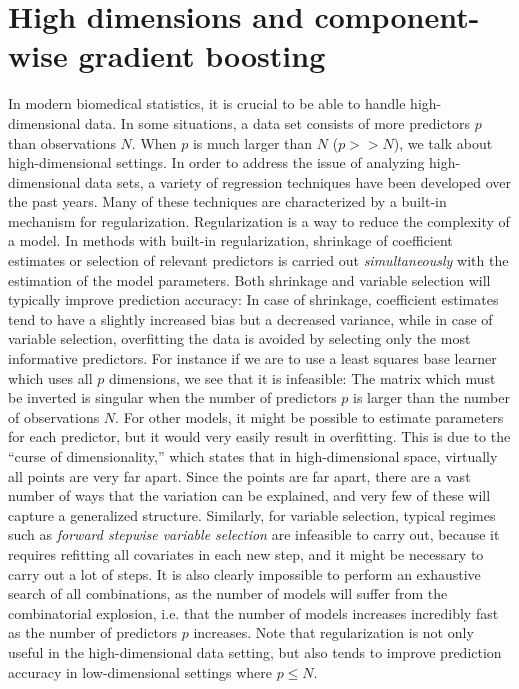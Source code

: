 \section{High dimensions and component-wise gradient boosting}\label{sec:component}
In modern biomedical statistics, it is crucial to be able to handle high-dimensional data.
In some situations, a data set consists of more predictors $p$ than observations $N$.
When $p$ is much larger than $N$ ($p>>N$), we talk about high-dimensional settings.
In order to address the issue of analyzing high-dimensional data sets, a variety of regression techniques have been developed over the past years.
Many of these techniques are characterized by a built-in mechanism for regularization.
Regularization is a way to reduce the complexity of a model.
In methods with built-in regularization, shrinkage of coefficient estimates or selection of relevant predictors is carried out \textit{simultaneously} with the estimation of the model parameters.
Both shrinkage and variable selection will typically improve prediction accuracy:
In case of shrinkage, coefficient estimates tend to have a slightly increased bias but a decreased variance, while in case of variable selection, overfitting the data is avoided by selecting only the most informative predictors.
For instance if we are to use a least squares base learner which uses all $p$ dimensions, we see that it is infeasible:
The matrix which must be inverted is singular when the number of predictors $p$ is larger than the number of observations $N$.
For other models, it might be possible to estimate parameters for each predictor, but it would very easily result in overfitting.
This is due to the ``curse of dimensionality,'' which states that in high-dimensional space, virtually all points are very far apart.
Since the points are far apart, there are a vast number of ways that the variation can be explained, and very few of these will capture a generalized structure.
Similarly, for variable selection, typical regimes such as \textit{forward stepwise variable selection} are infeasible to carry out, because it requires refitting all covariates in each new step, and it might be necessary to carry out a lot of steps.
It is also clearly impossible to perform an exhaustive search of all combinations, as the number of models will suffer from the combinatorial explosion, i.e. that the number of models increases incredibly fast as the number of predictors $p$ increases.
Note that regularization is not only useful in the high-dimensional data setting, but also tends to improve prediction accuracy in low-dimensional settings where $p\leq N$.

